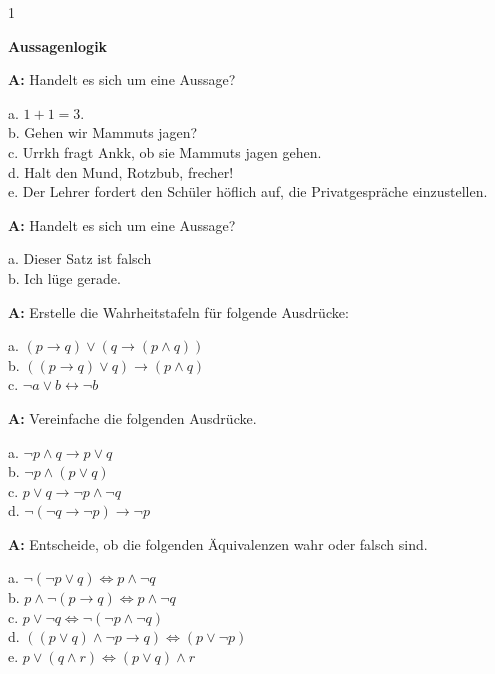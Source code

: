 \documentclass[landscape,twocolumn,a4paper]{article}
\begin{document}
\newcommand\x{1}
\setcounter {y} {1}

\parindent 0mm

\textbf{Aussagenlogik}

\bigskip

\textbf{A:} Handelt es sich um eine Aussage?  

a. $1 + 1 = 3.$  \\
b. Gehen wir Mammuts jagen? \\
c. Urrkh fragt Ankk, ob sie Mammuts jagen gehen. \\
d. Halt den Mund, Rotzbub, frecher!  \\
e. Der Lehrer fordert den Schüler höflich auf, die Privatgespräche einzustellen.
\bigskip {}
 

\textbf{A:} Handelt es sich um eine Aussage?
 
a. Dieser Satz ist falsch \\
b. Ich lüge gerade.  \bigskip {}

\textbf{A:} 
Erstelle die Wahrheitstafeln für folgende Ausdrücke:

a. $(p \rightarrow q) \lor (q \rightarrow (p \land q))$ \\
b. $((p \rightarrow q) \lor q) \rightarrow (p \land q)$ \\
c. $\lnot a \lor b \leftrightarrow \lnot b$
\bigskip {}

\textbf{A:} 
Vereinfache die folgenden Ausdrücke.

a. $\lnot p \land q \rightarrow p \lor q$ \\
b. $\lnot p \land (p \lor q)$ \\
c. $p \lor q \rightarrow \lnot p \land \lnot q$ \\
d. $\lnot (\lnot q \rightarrow \lnot p) \rightarrow \lnot p$ \\
\bigskip {}

\textbf{A:} 
Entscheide, ob die folgenden Äquivalenzen wahr oder falsch sind.

a. $\lnot(\lnot p \lor q) \Leftrightarrow p \land \lnot q$ \\
b. $p \land \lnot (p \rightarrow q) \Leftrightarrow p \land \lnot q$ \\
c. $p \lor \lnot q \Leftrightarrow \lnot ( \lnot p \land \lnot q)$ \\
d. $((p \lor q) \land \lnot p \rightarrow q) \Leftrightarrow (p \lor \lnot p)$ \\
e. $p \lor (q \land r) \Leftrightarrow (p \lor q) \land r$ 
\bigskip {}
\end{document}
